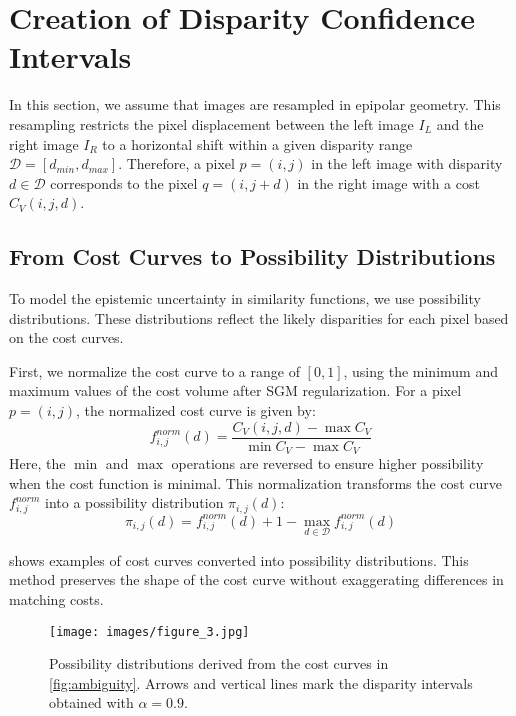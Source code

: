 \section{Creation of Disparity Confidence Intervals}\label{sec:intervals}

In this section, we assume that images are resampled in epipolar geometry. This resampling restricts the pixel displacement between the left image \( I_L \) and the right image \( I_R \) to a horizontal shift within a given disparity range \(\mathcal{D} = [d_{min}, d_{max}]\). Therefore, a pixel \( p = (i, j) \) in the left image with disparity \( d \in \mathcal{D} \) corresponds to the pixel \( q = (i, j + d) \) in the right image with a cost \( C_V(i, j, d) \).

\subsection{From Cost Curves to Possibility Distributions}

To model the epistemic uncertainty in similarity functions, we use possibility distributions. These distributions reflect the likely disparities for each pixel based on the cost curves.

First, we normalize the cost curve to a range of \([0,1]\), using the minimum and maximum values of the cost volume after SGM regularization. For a pixel \( p = (i, j) \), the normalized cost curve is given by:
\begin{equation}
    f_{i,j}^{norm}(d) = \frac{C_V(i,j,d) - \max C_V}{\min C_V - \max C_V}
\end{equation}
Here, the \(\min\) and \(\max\) operations are reversed to ensure higher possibility when the cost function is minimal. This normalization transforms the cost curve \( f_{i,j}^{norm} \) into a possibility distribution \( \pi_{i,j}(d) \):
\begin{equation}
    \pi_{i,j}(d) = f_{i,j}^{norm}(d) + 1 - \max_{d \in \mathcal{D}} f_{i,j}^{norm}(d) \label{eq:constant_norm}
\end{equation}

 shows examples of cost curves converted into possibility distributions. This method preserves the shape of the cost curve without exaggerating differences in matching costs.

\begin{figure}[t]
  \centering
  \texttt{[image: images/figure\_3.jpg]}
  \caption{Possibility distributions derived from the cost curves in \cref{fig:ambiguity}. Arrows and vertical lines mark the disparity intervals obtained with \(\alpha = 0.9\).}
  \label{fig:possibility}
\end{figure}

